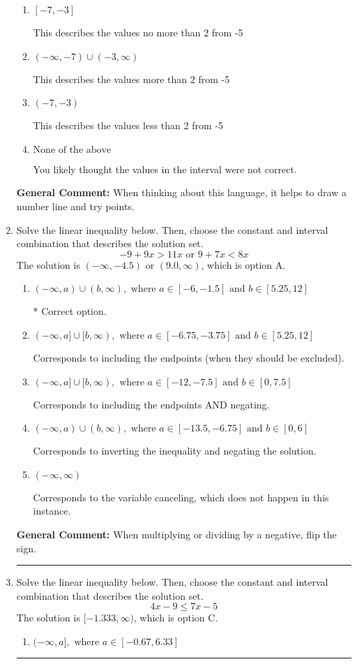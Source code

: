 \documentclass{extbook}[14pt]
\newcommand{\litem}[1]{\item #1

\rule{\textwidth}{0.4pt}}
\begin{document}
\begin{enumerate}
{\begin{enumerate}[label=\Alph*.]
This describes the values no less than 2 from -5
\item \( [-7, -3] \)

This describes the values no more than 2 from -5
\item \( (-\infty, -7) \cup (-3, \infty) \)

This describes the values more than 2 from -5
\item \( (-7, -3) \)

This describes the values less than 2 from -5
\item \( \text{None of the above} \)

You likely thought the values in the interval were not correct.
\end{enumerate}

\textbf{General Comment:} When thinking about this language, it helps to draw a number line and try points.
}
\litem{
Solve the linear inequality below. Then, choose the constant and interval combination that describes the solution set.
\[ -9 + 9 x > 11 x \text{ or } 9 + 7 x < 8 x \]The solution is \( (-\infty, -4.5) \text{ or } (9.0, \infty) \), which is option A.\begin{enumerate}[label=\Alph*.]
\item \( (-\infty, a) \cup (b, \infty), \text{ where } a \in [-6, -1.5] \text{ and } b \in [5.25, 12] \)

 * Correct option.
\item \( (-\infty, a] \cup [b, \infty), \text{ where } a \in [-6.75, -3.75] \text{ and } b \in [5.25, 12] \)

Corresponds to including the endpoints (when they should be excluded).
\item \( (-\infty, a] \cup [b, \infty), \text{ where } a \in [-12, -7.5] \text{ and } b \in [0, 7.5] \)

Corresponds to including the endpoints AND negating.
\item \( (-\infty, a) \cup (b, \infty), \text{ where } a \in [-13.5, -6.75] \text{ and } b \in [0, 6] \)

Corresponds to inverting the inequality and negating the solution.
\item \( (-\infty, \infty) \)

Corresponds to the variable canceling, which does not happen in this instance.
\end{enumerate}

\textbf{General Comment:} When multiplying or dividing by a negative, flip the sign.
}
\litem{
Solve the linear inequality below. Then, choose the constant and interval combination that describes the solution set.
\[ 4x -9 \leq 7x -5 \]The solution is \( [-1.333, \infty) \), which is option C.\begin{enumerate}[label=\Alph*.]
\item \( (-\infty, a], \text{ where } a \in [-0.67, 6.33] \)


\end{enumerate}}
\end{enumerate}
\end{document}
